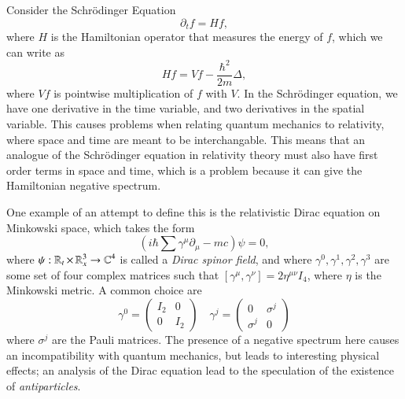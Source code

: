Consider the Schr\"{o}dinger Equation
%
\[ \partial_t f = H f, \]
%
where $H$ is the Hamiltonian operator that measures the energy of $f$, which we can write as
%
\[ Hf = V f - \frac{\hbar^2}{2m} \Delta, \]
%
where $V f$ is pointwise multiplication of $f$ with $V$. In the Schr\"{o}dinger equation, we have one derivative in the time variable, and two derivatives in the spatial variable. This causes problems when relating quantum mechanics to relativity, where space and time are meant to be interchangable. This means that an analogue of the Schr\"{o}dinger equation in relativity theory must also have first order terms in space and time, which is a problem because it can give the Hamiltonian negative spectrum.

One example of an attempt to define this is the relativistic Dirac equation on Minkowski space, which takes the form
%
\[ (i \hbar \sum \gamma^\mu \partial_\mu - mc) \psi = 0, \]
%
where $\psi: \operatorname{\mathbb{R}}_t \times \operatorname{\mathbb{R}}^3_x \to \operatorname{\mathbb{C}}^4$ is called a \emph{Dirac spinor field}, and where $\gamma^0, \gamma^1, \gamma^2, \gamma^3$ are some set of four complex matrices such that $[\gamma^\mu, \gamma^\nu] = 2 \eta^{\mu \nu} I_4$, where $\eta$ is the Minkowski metric. A common choice are
%
\[ \gamma^0 = \begin{pmatrix} I_2 & 0 \\ 0 & I_2 \end{pmatrix} \quad \gamma^j = \begin{pmatrix} 0 & \sigma^j \\ \sigma^j & 0 \end{pmatrix} \]
%
where $\sigma^j$ are the Pauli matrices. The presence of a negative spectrum here causes an incompatibility with quantum mechanics, but leads to interesting physical effects; an analysis of the Dirac equation lead to the speculation of the existence of \emph{antiparticles}.

%
%
%



